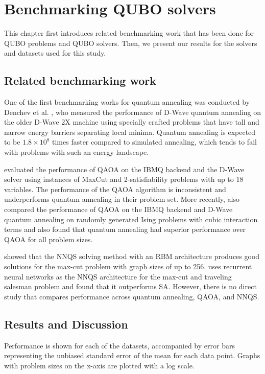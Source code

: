 \chapter{Benchmarking QUBO solvers}\label{benchmark}
This chapter first introduces related benchmarking work that has been done for QUBO problems and QUBO solvers. Then, we present our results for the solvers and datasets used for this study.

\section{Related benchmarking work}
One of the first benchmarking works for quantum annealing was conducted by Denchev et al. , who measured the performance of D-Wave quantum annealing on the older D-Wave 2X machine using specially crafted problems that have tall and narrow energy barriers separating local minima. Quantum annealing is expected to be $1.8 \times 10^8$ times faster compared to simulated annealing, which tends to fail with problems with such an energy landscape.


 evaluated the performance of QAOA on the IBMQ backend and the D-Wave solver using instances of MaxCut and 2-satisfiability problems with up to 18 variables. The performance of the QAOA algorithm is inconsistent and underperforms quantum annealing in their problem set. More recently,  also compared the performance of QAOA on the IBMQ backend and D-Wave quantum annealing on randomly generated Ising problems with cubic interaction terms and also found that quantum annealing had superior performance over QAOA for all problem sizes.

 showed that the NNQS solving method with an RBM architecture produces good solutions for the max-cut problem with graph sizes of up to 256.  uses recurrent neural networks as the NNQS architecture for the max-cut and traveling salesman problem and found that it outperforms SA. However, there is no direct study that compares performance across quantum annealing, QAOA, and NNQS.

\section{Results and Discussion}
Performance is shown for each of the datasets, accompanied by error bars representing the unbiased standard error of the mean for each data point. Graphs with problem sizes on the x-axis are plotted with a log scale.

